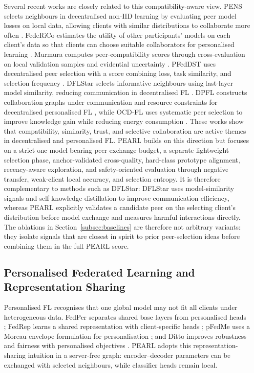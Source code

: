 \documentclass[conference]{IEEEtran}
\begin{document}
Several recent works are closely related to this compatibility-aware view. PENS selects neighbours in decentralised non-IID learning by evaluating peer model losses on local data, allowing clients with similar distributions to collaborate more often \cite{onoszko2021pens}. FedeRiCo estimates the utility of other participants' models on each client's data so that clients can choose suitable collaborators for personalised learning \cite{sui2022federico}. Murmura computes peer-compatibility scores through cross-evaluation on local validation samples and evidential uncertainty \cite{rangwala2025murmura}. PFedDST uses decentralised peer selection with a score combining loss, task similarity, and selection frequency \cite{fan2025pfeddst}. DFLStar selects informative neighbours using last-layer model similarity, reducing communication in decentralised FL \cite{soltani2024dflstar}. DPFL constructs collaboration graphs under communication and resource constraints for decentralised personalised FL \cite{kharrat2024dpfl}, while OCD-FL uses systematic peer selection to improve knowledge gain while reducing energy consumption \cite{masmoudi2024ocdfl}. These works show that compatibility, similarity, trust, and selective collaboration are active themes in decentralised and personalised FL. PEARL builds on this direction but focuses on a strict one-model-bearing-peer-exchange budget, a separate lightweight selection phase, anchor-validated cross-quality, hard-class prototype alignment, recency-aware exploration, and safety-oriented evaluation through negative transfer, weak-client local accuracy, and selection entropy. It is therefore complementary to methods such as DFLStar: DFLStar uses model-similarity signals and self-knowledge distillation to improve communication efficiency, whereas PEARL explicitly validates a candidate peer on the selecting client's distribution before model exchange and measures harmful interactions directly. The ablations in Section~\ref{subsec:baselines} are therefore not arbitrary variants: they isolate signals that are closest in spirit to prior peer-selection ideas before combining them in the full PEARL score.

\subsection{Personalised Federated Learning and Representation Sharing}
\label{subsec:personalised-federated-learning-and-representation}
Personalised FL recognises that one global model may not fit all clients under heterogeneous data. FedPer separates shared base layers from personalised heads \cite{arivazhagan2019fedper}; FedRep learns a shared representation with client-specific heads \cite{collins2021exploiting}; pFedMe uses a Moreau-envelope formulation for personalisation \cite{dinh2020pfedme}; and Ditto improves robustness and fairness with personalised objectives \cite{li2021ditto}. PEARL adopts this representation-sharing intuition in a server-free graph: encoder--decoder parameters can be exchanged with selected neighbours, while classifier heads remain local.
\end{document}
